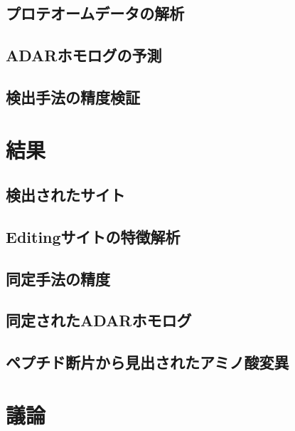 \subsection{プロテオームデータの解析}
\subsection{ADARホモログの予測}
\subsection{検出手法の精度検証}
\section{結果}
\subsection{検出されたサイト}
\subsection{Editingサイトの特徴解析}
\subsection{同定手法の精度}
\subsection{同定されたADARホモログ}
\subsection{ペプチド断片から見出されたアミノ酸変異}
\section{議論}